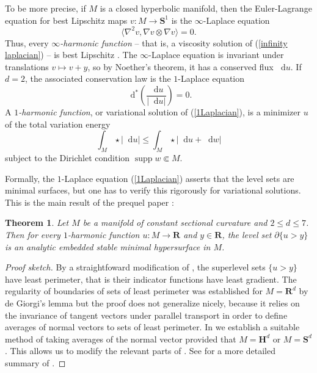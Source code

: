 \documentclass[reqno,11pt]{amsart}
\newcommand{\RR}{\mathbf{R}}
\newcommand{\Hyp}{\mathbf H}
\newcommand{\Sph}{\mathbf S}
\newcommand*\dif{\mathop{}\!\mathrm{d}}
\DeclareMathOperator{\supp}{supp}
\newcommand{\dfn}[1]{\emph{#1}\index{#1}}
\newtheorem{theorem}{Theorem}[section]
\theoremstyle{definition}
\numberwithin{equation}{section}
\begin{document}
To be more precise, if $M$ is a closed hyperbolic manifold, then the Euler-Lagrange equation for best Lipschitz maps $v: M \to \Sph^1$ is the $\infty$-Laplace equation
\begin{equation}\label{infinity laplacian}
	\langle \nabla^2 v, \nabla v \otimes \nabla v\rangle = 0.
\end{equation}
Thus, every \dfn{$\infty$-harmonic function} -- that is, a viscosity solution of (\ref{infinity laplacian}) -- is best Lipschitz \cite{daskalopoulos2020transverse}.
The $\infty$-Laplace equation is invariant under translations $v \mapsto v + y$, so by Noether's theorem, it has a conserved flux $\dif u$.
If $d = 2$, the associated conservation law is the $1$-Laplace equation
\begin{equation}\label{1Laplacian}
\dif^* \left(\frac{\dif u}{|\dif u|}\right) = 0.
\end{equation}
A \dfn{$1$-harmonic function}, or variational solution of (\ref{1Laplacian}), is a minimizer $u$ of the total variation energy
\begin{equation}\label{least gradient functional}
	\int_M \star |\dif u| \leq \int_M \star |\dif u + \dif w|
\end{equation}
subject to the Dirichlet condition $\supp w \Subset M$.

Formally, the $1$-Laplace equation (\ref{1Laplacian}) asserts that the level sets are minimal surfaces, but one has to verify this rigorously for variational solutions.
This is the main result of the prequel paper \cite{BackusFLG}:

\begin{theorem}\label{main thm of old paper}
Let $M$ be a manifold of constant sectional curvature and $2 \leq d \leq 7$.
Then for every $1$-harmonic function $u: M \to \RR$ and $y \in \RR$, the level set $\partial \{u > y\}$ is an analytic embedded stable minimal hypersurface in $M$.
\end{theorem}
\begin{proof}[Proof sketch]
By a straightfoward modification of \cite[Theorem 1]{BOMBIERI1969}, the superlevel sets $\{u > y\}$ have least perimeter, that is their indicator functions have least gradient.
The regularity of boundaries of sets of least perimeter was established for $M = \RR^d$ by de Giorgi's lemma \cite{Miranda66} but the proof does not generalize nicely, because it relies on the invariance of tangent vectors under parallel transport in order to define averages of normal vectors to sets of least perimeter.
In \cite[\S3]{BackusFLG} we establish a suitable method of taking averages of the normal vector provided that $M = \Hyp^d$ or $M = \Sph^d$.
This allows us to modify the relevant parts of \cite{Miranda66}.
See \cite[\S1]{BackusFLG} for a more detailed summary of \cite{BackusFLG}.
\end{proof}
\end{document}
